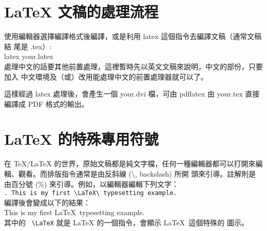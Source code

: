 \documentclass[12pt, a4paper]{report}
\begin{document}
  \section{LaTeX 文稿的處理流程}
    使用編輯器選擇編譯格式後編譯，或是利用 latex 這個指令去編譯文稿（通常文稿結
      尾是 .tex）: \\
      \indent latex your.latex \\
    處理中文的話要其他前置處理，這裡暫時先以英文文稿來說明，中文的部份，只要加入
      中文環境及（或）改用能處理中文的前置處理器就可以了。

    這樣經過 latex 處理後，會產生一個 your.dvi 檔，可由 pdflatex 由 
      your.tex 直接編譯成 PDF 格式的輸出。
  \section{LaTeX 的特殊專用符號}
    在 TeX/LaTeX 的世界，原始文稿都是純文字檔，任何一種編輯器都可以打開來編
      輯、觀看。而排版指令通常是由反斜線 (\textbackslash, backslash) 所開
      頭來引導。註解則是由百分號 (\%) 來引導。例如，以編輯器編輯下列文字：  \\
      \verb+. This is my first \LaTeX\ typesetting example.+  \\
    編譯後會變成以下的結果：\\
      \indent This is my first \LaTeX\ typesetting example. \\
    其中的 \verb+ \LaTeX+ 就是 LaTeX 的一個指令，會顯示 \LaTeX\ 這個特殊的
      圖示。
\end{document}
